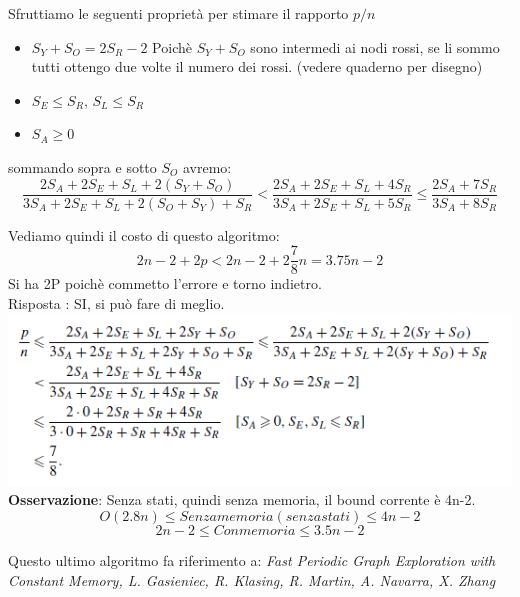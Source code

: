 Sfruttiamo le seguenti proprietà per stimare il rapporto $p/n$\\
\vspace{-10mm}
\begin{itemize}
\item $S_Y + S_O = 2 S_R - 2$ Poichè $S_Y + S_O$ sono intermedi ai nodi rossi, se li sommo tutti ottengo due volte il numero dei rossi. (vedere quaderno per disegno)
\item $S_E \leq S_R$, $S_L \leq S_R$
\item $S_A \geq 0$
\end{itemize}
sommando sopra e sotto $S_O$ avremo: \\
$$\frac{2 S_A + 2 S_E + S_L + 2(S_Y + S_O)}{3 S_A + 2 S_E + S_L + 2(S_O + S_Y) + S_R} < \frac{2 S_A + 2 S_E + S_L + 4 S_R}{3 S_A + 2 S_E + S_L + 5 S_R} \leq \frac{2 S_A + 7 S_R}{3 S_A + 8 S_R} $$

Vediamo quindi il costo di questo algoritmo:\\
$$ 2n - 2 + 2p < 2n -2 + 2 \frac{7}{8} n = 3.75n -2 $$
Si ha 2P poichè commetto l'errore e torno indietro.\\
Risposta : SI, si può fare di meglio.\\

\includegraphics[]{images/66.png}\\
\textbf{Osservazione}: Senza stati, quindi senza memoria, il bound corrente è 4n-2.\\
$$O(2.8n) \leq Senza memoria (senza stati) \leq 4n-2$$
$$2n-2 \leq Con memoria \leq 3.5n -2 $$

Questo ultimo algoritmo fa riferimento a: \emph{Fast Periodic Graph Exploration with Constant Memory, 
L. Gasieniec, R. Klasing, R. Martin, A. Navarra, X. Zhang}


